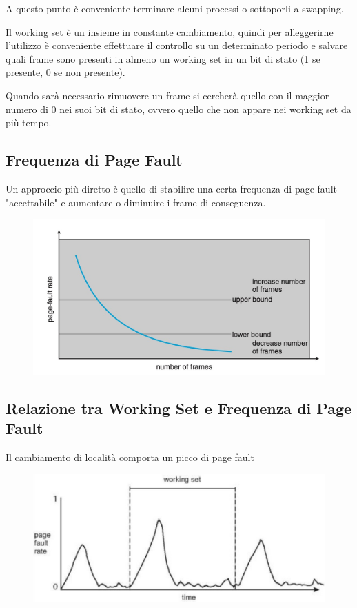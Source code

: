 A questo punto è conveniente terminare alcuni processi o sottoporli a swapping.

\spacer
Il working set è un insieme in constante cambiamento, quindi per alleggerirne l'utilizzo è conveniente effettuare il controllo su un determinato periodo e salvare quali frame sono presenti in almeno un working set in un bit di stato (1 se presente, 0 se non presente).

Quando sarà necessario rimuovere un frame si cercherà quello con il maggior numero di 0 nei suoi bit di stato, ovvero quello che non appare nei working set da più tempo.

\subsection{Frequenza di Page Fault}
Un approccio più diretto è quello di stabilire una certa frequenza di page fault "accettabile" e aumentare o diminuire i frame di conseguenza.

\begin{figure}[H]
    \centering
    \includegraphics[width=0.5\linewidth]{assets/frequenza-page-fault.jpg}
\end{figure}

\subsection{Relazione tra Working Set e Frequenza di Page Fault}
Il cambiamento di località comporta un picco di page fault

\begin{figure}[H]
    \centering
    \includegraphics[width=0.5\linewidth]{assets/page-fault-working-set.jpeg}
\end{figure}
